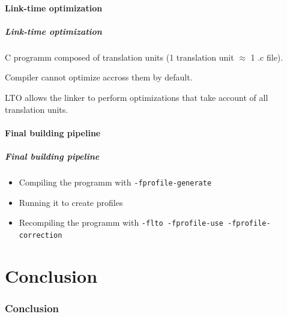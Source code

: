 \documentclass{beamer}
\begin{document}
    \subsection{Link-time optimization}

    \begin{frame}
        \frametitle{Link-time optimization}

        C programm composed of translation units (1 translation unit $ \approx $ 1 .c file).

        Compiler cannot optimize accross them by default.

        LTO allows the linker to perform optimizations that take account of all translation units.
    \end{frame}

    \subsection{Final building pipeline}

    \begin{frame}[fragile]
        \frametitle{Final building pipeline}

        \begin{itemize}
            \item Compiling the programm with \verb'-fprofile-generate'
            \item Running it to create profiles
            \item Recompiling the programm with \verb'-flto -fprofile-use -fprofile-correction'
        \end{itemize}
    \end{frame}

\part{Conclusion}
\section*{Conclusion}
\end{document}
